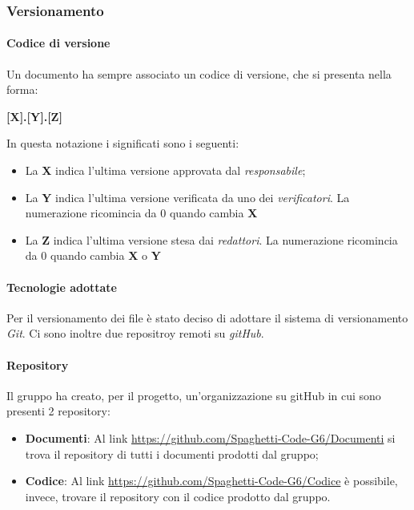 \documentclass[../norme_di_progetto.tex]{subfiles}
\begin{document}
\subsubsection{Versionamento}

\paragraph{Codice di versione}
Un documento ha sempre associato un codice di versione, che si presenta nella forma:
\begin{center}
    \textbf{[X].[Y].[Z]}
\end{center}

In questa notazione i significati sono i seguenti:
\begin{itemize}
    \item La \textbf{X} indica l'ultima versione approvata dal \emph{responsabile};
    \item La \textbf{Y} indica l'ultima versione verificata da uno dei \emph{verificatori}. La numerazione ricomincia da 0 quando cambia \textbf{X}
    \item La \textbf{Z} indica l'ultima versione stesa dai \emph{redattori}. La numerazione ricomincia da 0 quando cambia \textbf{X} o \textbf{Y}
\end{itemize}

\paragraph{Tecnologie adottate}
Per il versionamento dei file è stato deciso di adottare il sistema di versionamento \emph{Git}. Ci sono inoltre due repositroy remoti su \emph{gitHub}.

\paragraph{Repository}
Il gruppo ha creato, per il progetto, un'organizzazione su gitHub in cui sono presenti 2 repository:
\begin{itemize}
    \item \textbf{Documenti}: Al link \url{https://github.com/Spaghetti-Code-G6/Documenti} si trova il repository di tutti i documenti prodotti dal gruppo;
    \item \textbf{Codice}: Al link \url{https://github.com/Spaghetti-Code-G6/Codice} è possibile, invece, trovare il repository con il codice prodotto dal gruppo.
\end{itemize}
\end{document}
